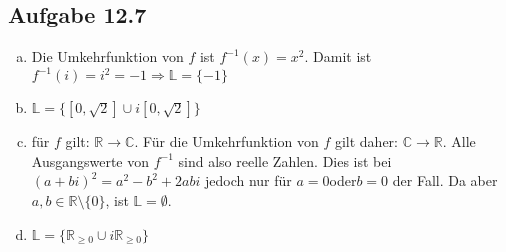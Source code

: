 \documentclass{standalone}
\begin{document}
\subsection{Aufgabe 12.7}
\begin{enumerate}[a)]
\item Die Umkehrfunktion von $f$ ist $f^{-1}(x) = x^2$. Damit ist $f^{-1}(i) = i^2 = -1 \Rightarrow \mathbb{L} = \{-1\}$
\item $\mathbb{L} = \{ [0, \sqrt{2}] \cup i[0, \sqrt{2}]\}$
\item für $f$ gilt: $\mathbb{R} \rightarrow \mathbb{C}$. Für die Umkehrfunktion von $f$ gilt daher: $\mathbb{C} \rightarrow \mathbb{R}$. Alle Ausgangswerte von $f^{-1}$ sind also reelle Zahlen. Dies ist bei $(a+bi)^2 = a^2 - b^2 + 2abi$ jedoch nur für $a = 0 $oder$b = 0$ der Fall. Da aber $a, b \in \mathbb{R} \setminus \{0\}$, ist $\mathbb{L} = \emptyset$.
\item $\mathbb{L} = \{\mathbb{R}_{\geqslant 0} \cup i \mathbb{R}_{\geqslant 0}\}$
\end{enumerate}
\end{document}
